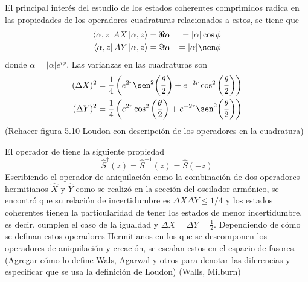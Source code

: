 El principal interés del estudio de los estados coherentes comprimidos radica en las propiedades de los operadores cuadraturas relacionados a estos, se tiene que
\begin{align*}
  \bra{\alpha, z}\hat{X}\ket{\alpha, z}   & = \Re \alpha & = |\alpha| \cos\phi \\
  \bra{\alpha, z} \hat{Y} \ket{\alpha, z} & = \Im \alpha & = |\alpha| \sen\phi
\end{align*}
donde $\alpha = |\alpha|e^{i\phi}$. Las varianzas en las cuadraturas son
\begin{align*}
  (\Delta X)^2 & = \frac{1}{4}\left( e^{2r}\sen^2{\left( \frac{\theta}{2} \right)} +e^{-2r}\cos^2{\left( \frac{\theta}{2} \right)} \right) \\
  (\Delta Y)^2 & = \frac{1}{4}\left( e^{2r}\cos^2{\left( \frac{\theta}{2} \right)} +e^{-2r}\sen^2{\left( \frac{\theta}{2} \right)} \right)
\end{align*}
(Rehacer figura 5.10 Loudon con descripción de los operadores en la cuadratura)

El operador de tiene la siguiente propiedad
\begin{equation*}
  \hat{S}^{\dagger}(z) = \hat{S}^{-1}(z) = \hat{S}(-z)
\end{equation*}
Escribiendo el operador de aniquilación como la combinación de dos operadores hermitianos $\hat{X}$ y $\hat{Y}$ como se realizó en la sección del oscilador armónico, se encontró que su relación de incertidumbre es $\Delta X \Delta Y \leq 1/4$ y los estados coherentes tienen la particularidad de tener los estados de menor incertidumbre, es decir, cumplen el caso de la igualdad y $\Delta X = \Delta Y = \frac{1}{2}$. Dependiendo de cómo se definan estos operadores Hermitianos en los que se descomponen los operadores de aniquilación y creación, se escalan estos en el espacio de fasores. (Agregar cómo lo define Wals, Agarwal y otros para denotar las diferencias y especificar que se usa la definición de Loudon)
(Walls, Milburn)